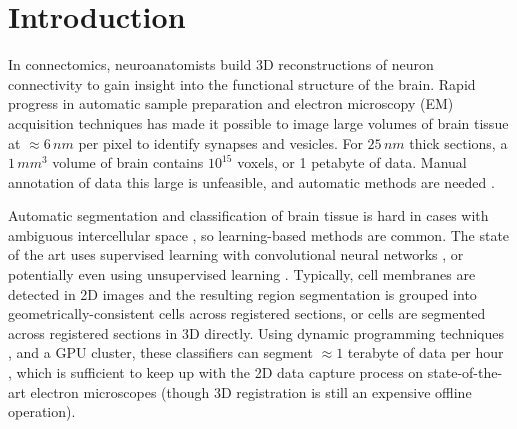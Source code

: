 \section{Introduction}


In connectomics, neuroanatomists build 3D reconstructions of neuron connectivity to gain insight into the functional structure of the brain. Rapid progress in automatic sample preparation and electron microscopy (EM) acquisition techniques has made it possible to image large volumes of brain tissue at $\approx6\, nm$ per pixel to identify synapses and vesicles. For $25\, nm$ thick sections, a $1\, mm^3$ volume of brain contains $10^{15}$ voxels, or 1 petabyte of data. Manual annotation of data this large is unfeasible, and automatic methods are needed \cite{jain2010,Liu2014,GALA2014,kaynig2015large}.

Automatic segmentation and classification of brain tissue is hard in cases with ambiguous intercellular space \cite{isbi_challenge}, so learning-based methods are common. The state of the art uses supervised learning with convolutional neural networks \cite{Ciresan:2012f}, or potentially even using unsupervised learning \cite{BogovicHJ13}. Typically, cell membranes are detected in 2D images and the resulting region segmentation is grouped into geometrically-consistent cells across registered sections, or cells are segmented across registered sections in 3D directly. Using dynamic programming techniques \cite{Masci:2013a}, and a GPU cluster, these classifiers can segment  $\approx1$ terabyte of data per hour \cite{kasthuri2015saturated}, which is sufficient to keep up with the 2D data capture process on state-of-the-art electron microscopes (though 3D registration is still an expensive offline operation).



